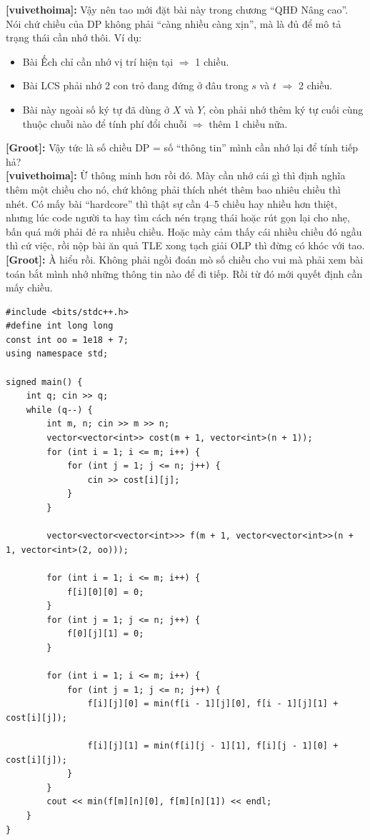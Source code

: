 \textbf{[vuivethoima]:} Vậy nên tao mới đặt bài này trong chương ``QHĐ Nâng cao''. Nói chứ chiều của DP không phải ``càng nhiều càng xịn'', mà là đủ để mô tả trạng thái cần nhớ thôi.  
Ví dụ: 
\begin{itemize}
    \item Bài Ếch chỉ cần nhớ vị trí hiện tại $\Rightarrow$ 1 chiều.
    \item Bài LCS phải nhớ 2 con trỏ đang đứng ở đâu trong $s$ và $t$ $\Rightarrow$ 2 chiều.
    \item Bài này ngoài số ký tự đã dùng ở $X$ và $Y$, 
    còn phải nhớ thêm ký tự cuối cùng thuộc chuỗi nào để tính phí đổi chuỗi $\Rightarrow$ thêm 1 chiều nữa.
\end{itemize}

\textbf{[Groot]:} Vậy tức là số chiều DP = số ``thông tin'' mình cần nhớ lại để tính tiếp hả?\\

\textbf{[vuivethoima]:} Ừ thông minh hơn rồi đó. Mày cần nhớ cái gì thì định nghĩa thêm một chiều cho nó, chứ không phải thích nhét thêm bao nhiêu chiều thì nhét.  
Có mấy bài ``hardcore'' thì thật sự cần 4–5 chiều hay nhiều hơn thiệt, nhưng lúc code người ta hay tìm cách nén trạng thái hoặc rút gọn lại cho nhẹ, bấn quá mới phải đẻ ra nhiều chiều. Hoặc mày cảm thấy cái nhiều chiều đó ngầu thì cứ việc, rồi nộp bài ăn quả TLE xong tạch giải OLP thì đừng có khóc với tao.\\

\textbf{[Groot]:} À hiểu rồi. Không phải ngồi đoán mò số chiều cho vui mà phải xem bài toán bắt mình nhớ những thông tin nào để đi tiếp. Rồi từ đó mới quyết định cần mấy chiều. \\

\begin{lstlisting}[title=\centering\textbf{Cài đặt}]
#include <bits/stdc++.h>
#define int long long
const int oo = 1e18 + 7;
using namespace std;

signed main() {
    int q; cin >> q;
    while (q--) {
        int m, n; cin >> m >> n;
        vector<vector<int>> cost(m + 1, vector<int>(n + 1));
        for (int i = 1; i <= m; i++) {
            for (int j = 1; j <= n; j++) {
                cin >> cost[i][j];
            }
        }

        vector<vector<vector<int>>> f(m + 1, vector<vector<int>>(n + 1, vector<int>(2, oo)));

        for (int i = 1; i <= m; i++) {
            f[i][0][0] = 0;
        }
        for (int j = 1; j <= n; j++) {
            f[0][j][1] = 0;
        }

        for (int i = 1; i <= m; i++) {
            for (int j = 1; j <= n; j++) {
                f[i][j][0] = min(f[i - 1][j][0], f[i - 1][j][1] + cost[i][j]);

                f[i][j][1] = min(f[i][j - 1][1], f[i][j - 1][0] + cost[i][j]);
            }
        }
        cout << min(f[m][n][0], f[m][n][1]) << endl;
    }
}
\end{lstlisting}


